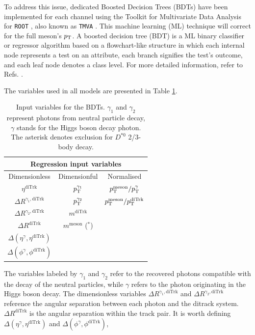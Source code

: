 \begin{myitemlist}
    To address this issue, dedicated Boosted Decision Trees (BDTs) have been implemented for each channel using the Toolkit for Multivariate Data Analysis for \verb+ROOT+ \cite{CERN:root}, also known as \verb+TMVA+ \cite{TMVA:2007ngy}. This machine learning (ML) technique will correct for the full meson's $p_\text{T}$. A boosted decision tree (BDT) is a ML binary classifier or regressor algorithm based on a flowchart-like structure in which each internal node represents a test on an attribute, each branch signifies the test's outcome, and each leaf node denotes a class level. For more detailed information, refer to Refs. \cite{TMVA:2007ngy, Coadou:2022nsh}.

    The variables used in all models are presented in Table \ref{tab:model_variables}.
    \begin{table}[!ht]
        \centering
        \begin{tabular}{|c|c|c|}
            \hline
            \multicolumn{3}{|c|}{\cellcolor{lightgray} Regression input variables} \\ \hline
            \cellcolor{lightgray}Dimensionless  &\cellcolor{lightgray}Dimensionful  &\cellcolor{lightgray}Normalised            \\\hline
            $\eta^{\text{diTrk}}$                           &$p_\text{T}^{\gamma_1}$       &$p_\text{T}^{\text{meson}}/p_\text{T}^{\gamma}$          \\
            $\Delta R^{\gamma_1, \text{diTrk}}$             &$p_\text{T}^{\gamma_2}$       &$p_\text{T}^{\text{meson}}/p_\text{T}^{\text{diTrk}}$    \\
            $\Delta R^{\gamma_2, \text{diTrk}}$             &$m^{\text{diTrk}}$     &           \\
            $\Delta R^{\text{diTrk}}$                       &$m^{\text{meson}}$ ($^*$)  &       \\
            $\Delta(\eta^{\gamma}, \eta^{\text{diTrk}})$    & & \\
            $\Delta(\phi^{\gamma}, \phi^{\text{diTrk}})$    & & \\
            \hline
        \end{tabular}
        \caption{Input variables for the BDTs. $\gamma_1$ and $\gamma_2$ represent photons from neutral particle decay, $\gamma$ stands for the Higgs boson decay photon. The asterisk denotes exclusion for $D^{*0}$ 2/3-body decay.}
        \label{tab:model_variables}
    \end{table}
    The variables labeled by $\gamma_1$ and $\gamma_2$ refer to the recovered photons compatible with the decay of the neutral particles, while $\gamma$ refers to the photon originating in the Higgs boson decay. The dimensionless variables $\Delta R^{\gamma_1, \text{diTrk}}$ and $\Delta R^{\gamma_2, \text{diTrk}}$ reference the angular separation between each photon and the ditrack system. $\Delta R^{\text{diTrk}}$ is the angular separation within the track pair. It is worth defining $\Delta(\eta^{\gamma}, \eta^{\text{diTrk}})$ and $\Delta(\phi^{\gamma}, \phi^{\text{diTrk}})$,

\end{myitemlist}
